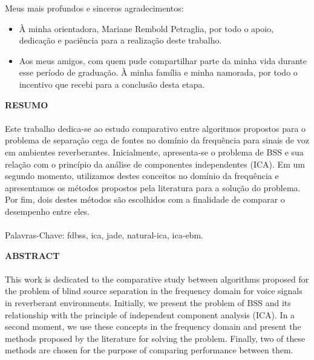 Meus mais profundos e sinceros agradecimentos:
\begin{itemize}
    \item À minha orientadora, Mariane Rembold Petraglia, por todo o apoio, dedicação e paciência para a realização deste trabalho. 
    \item Aos meus amigos, com quem pude compartilhar parte da minha vida durante esse período de graduação.
    À minha família e minha namorada, por todo o incentivo que recebi para a conclusão desta etapa.
\end{itemize}

\pagebreak


\begin{center}
\textbf{RESUMO}
\end{center}
      \vspace{0.5cm}

\paragraph{}
Este trabalho dedica-se ao estudo comparativo entre algoritmos propostos para o problema de separação cega de fontes no domínio da frequência para sinais de voz em ambientes reverberantes. Inicialmente, apresenta-se o problema de BSS e sua relação com o princípio da análise de componentes independentes (ICA). Em um segundo momento, utilizamos destes conceitos no domínio da frequência e apresentamos os métodos propostos pela literatura para a solução do problema. Por fim, dois destes métodos são escolhidos com a finalidade de comparar o desempenho entre eles.

\paragraph{}
\noindent Palavras-Chave: fdbss, ica, jade, natural-ica, ica-ebm.

\pagebreak


\begin{center}
\textbf{ABSTRACT}
\end{center}
      \vspace{0.5cm}

\paragraph{}

This work is dedicated to the comparative study between algorithms proposed for the problem of blind source separation in the frequency domain for voice signals in reverberant environments. Initially, we present the problem of BSS and its relationship with the principle of independent component analysis (ICA). In a second moment, we use these concepts in the frequency domain and present the methods proposed by the literature for solving the problem. Finally, two of these methods are chosen for the purpose of comparing performance between them.

